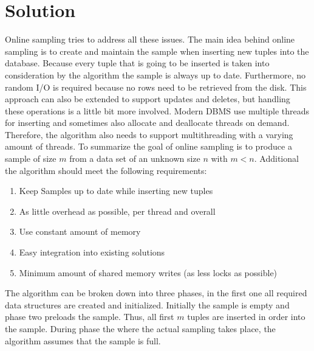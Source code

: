 \documentclass[sigconf,nonacm]{acmart}
\begin{document}
    \section{Solution}
        Online sampling tries to address all these issues. The main idea behind online sampling is to create and maintain the sample when inserting new tuples into the database. Because every tuple that is going to be inserted is taken into consideration by the algorithm the sample is always up to date. Furthermore, no random I/O is required because no rows need to be retrieved from the disk. This approach can also be extended to support updates and deletes, but handling these operations is a little bit more involved. Modern DBMS use multiple threads for inserting and sometimes also allocate and deallocate threads on demand. Therefore, the algorithm also needs to support multithreading with a varying amount of threads.
        To summarize the goal of online sampling is to produce a sample of size $m$ from a data set of an unknown size $n$ with $m<n$. Additional the algorithm should meet the following requirements:
        \begin{enumerate}
            \item Keep Samples up to date while inserting new tuples
            \item As little overhead as possible, per thread and overall
            \item Use constant amount of memory
            \item Easy integration into existing solutions
            \item Minimum amount of shared memory writes (as less locks as possible)
        \end{enumerate}
        
        The algorithm can be broken down into three phases, in the first one all required data structures are created and initialized. Initially the sample is empty and phase two preloads the sample. Thus, all first $m$ tuples are inserted in order into the sample. During phase the where the actual sampling takes place, the algorithm assumes that the sample is full.
        
\end{document}

